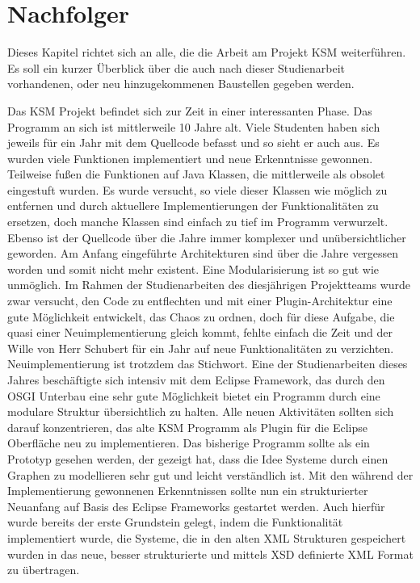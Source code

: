 \section{Nachfolger}

Dieses Kapitel richtet sich an alle, die die Arbeit am Projekt KSM weiterführen. Es soll ein kurzer Überblick über die auch nach dieser Studienarbeit vorhandenen, oder neu hinzugekommenen Baustellen gegeben werden. 

Das KSM Projekt befindet sich zur Zeit in einer interessanten Phase. Das Programm an sich ist mittlerweile 10 Jahre alt. Viele Studenten haben sich jeweils für ein Jahr mit dem Quellcode befasst und so sieht er auch aus. Es wurden viele Funktionen implementiert und neue Erkenntnisse gewonnen. Teilweise fußen die Funktionen auf Java Klassen, die mittlerweile als obsolet eingestuft wurden. Es wurde versucht, so viele dieser Klassen wie möglich zu entfernen und durch aktuellere Implementierungen der Funktionalitäten zu ersetzen, doch manche Klassen sind einfach zu tief im Programm verwurzelt. Ebenso ist der Quellcode über die Jahre immer komplexer und unübersichtlicher geworden. Am Anfang eingeführte Architekturen sind über die Jahre vergessen worden und somit nicht mehr existent. Eine Modularisierung ist so gut wie unmöglich. Im Rahmen der Studienarbeiten des diesjährigen Projektteams wurde zwar versucht, den Code zu entflechten und mit einer Plugin-Architektur eine gute Möglichkeit entwickelt, das Chaos zu ordnen, doch für diese Aufgabe, die quasi einer Neuimplementierung gleich kommt, fehlte einfach die Zeit und der Wille von Herr Schubert für ein Jahr auf neue Funktionalitäten zu verzichten. Neuimplementierung ist trotzdem das Stichwort. Eine der Studienarbeiten dieses Jahres beschäftigte sich intensiv mit dem Eclipse Framework, das durch den OSGI Unterbau eine sehr gute Möglichkeit bietet ein Programm durch eine modulare Struktur übersichtlich zu halten. Alle neuen Aktivitäten sollten sich darauf konzentrieren, das alte KSM Programm als Plugin für die Eclipse Oberfläche neu zu implementieren. Das bisherige Programm sollte als ein Prototyp gesehen werden, der gezeigt hat, dass die Idee Systeme durch einen Graphen zu modellieren sehr gut und leicht verständlich ist. Mit den während der Implementierung gewonnenen Erkenntnissen sollte nun ein strukturierter Neuanfang auf Basis des Eclipse Frameworks gestartet werden. Auch hierfür wurde bereits der erste Grundstein gelegt, indem die Funktionalität implementiert wurde, die Systeme, die in den alten XML Strukturen gespeichert wurden in das neue, besser strukturierte und mittels XSD definierte XML Format zu übertragen.

